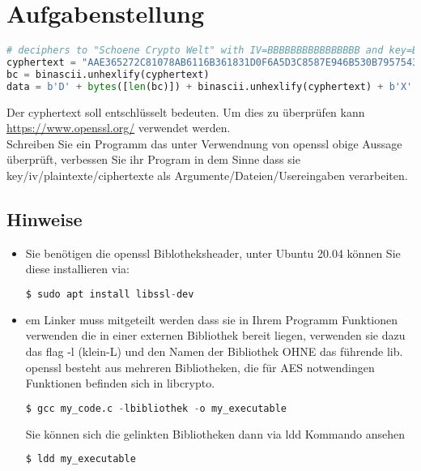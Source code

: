 \newpage
\section{Aufgabenstellung}
    \begin{lstlisting}[language=Python, style=Stylepython, caption=Angabge, captionpos=b, label=Angabge]
# deciphers to "Schoene Crypto Welt" with IV=BBBBBBBBBBBBBBBB and key=BBBBBBBBBBBBBBBB aes128-cbc
cyphertext = "AAE365272C81078AB6116B361831D0F6A5D3C8587E946B530B7957543107F15E"
bc = binascii.unhexlify(cyphertext)
data = b'D' + bytes([len(bc)]) + binascii.unhexlify(cyphertext) + b'X'  
\end{lstlisting}
    
\noindent  Der cyphertext soll entschlüsselt  bedeuten. 
Um dies zu überprüfen kann \href{OpenSSL}{https://www.openssl.org/} verwendet werden.\\

\noindent Schreiben Sie ein Programm das unter Verwendnung von openssl obige Aussage überprüft, 
verbessen Sie ihr Program in dem Sinne dass sie key/iv/plaintexte/ciphertexte als Argumente/Dateien/Usereingaben verarbeiten.

\subsection*{Hinweise}
\begin{itemize}
    \item Sie benötigen die openssl Biblotheksheader, unter Ubuntu 20.04 können Sie diese installieren via:
    \begin{lstlisting}[language=Python, style=Stylepython, caption=Angabge, captionpos=b, label=Angabge]
$ sudo apt install libssl-dev
    \end{lstlisting}
    
    \item em Linker muss mitgeteilt werden dass sie in Ihrem Programm Funktionen verwenden die in einer externen Bibliothek bereit liegen, verwenden 
    sie dazu das flag -l (klein-L) und den Namen der Bibliothek OHNE das führende lib. 
    openssl besteht aus mehreren Bibliotheken, die für AES notwendingen Funktionen befinden sich in libcrypto.
    \begin{lstlisting}[language=Python, style=Stylepython, caption=Angabge, captionpos=b, label=Angabge]
$ gcc my_code.c -lbibliothek -o my_executable
    \end{lstlisting}
    Sie können sich die gelinkten Bibliotheken dann via ldd Kommando ansehen
    \begin{lstlisting}[language=Python, style=Stylepython, caption=Angabge, captionpos=b, label=Angabge]
$ ldd my_executable
    \end{lstlisting}
\end{itemize}
